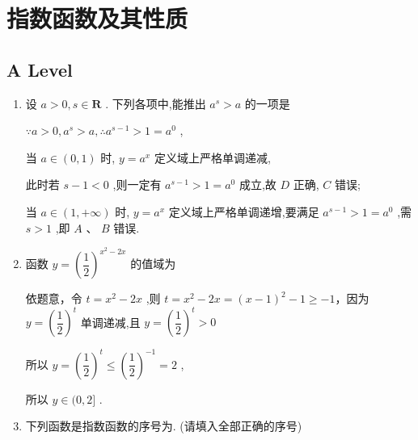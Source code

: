 \newpage
\quad
\newpage
\section*{指数函数及其性质}
\subsection*{A Level}
\begin{enumerate}
    \item 设 $a > 0,s \in  \mathbf{R}$ . 下列各项中,能推出 ${a}^{s} > a$ 的一项是
    \begin{jieda}
        $\because a > 0,{a}^{s} > a,\therefore {a}^{s - 1} > 1 = {a}^{0}$ ,
        
        当 $a \in  \left( {0,1}\right)$ 时, $y = {a}^{x}$ 定义域上严格单调递减,
        
        此时若 $s - 1 < 0$ ,则一定有 ${a}^{s - 1} > 1 = {a}^{0}$ 成立,故 ${D}$ 正确, ${C}$ 错误;
        
        当 $a \in  \left( {1, + \infty }\right)$ 时, $y = {a}^{x}$ 定义域上严格单调递增,要满足 ${a}^{s - 1} > 1 = {a}^{0}$ ,需 $s > 1$ ,即 ${A}\text{ 、 }{B}$ 错误.
    \end{jieda}
    \item  函数 $y = {\left( \dfrac{1}{2}\right) }^{{x}^{2} - {2x}}$ 的值域为
    \begin{jieda}
        依题意，令 $t = {x}^{2} - {2x}$ ,则 $t = {x}^{2} - {2x} = {\left( x - 1\right) }^{2} - 1 \geq   - 1$，因为 $y = {\left( \dfrac{1}{2}\right) }^{t}$ 单调递减,且 $y = {\left( \dfrac{1}{2}\right) }^{t} > 0$
        
        所以 $y = {\left( \dfrac{1}{2}\right) }^{t} \leq  {\left( \dfrac{1}{2}\right) }^{-1} = 2$ ,
        
        所以 $y \in  (0,2\rbrack$ .
    \end{jieda}
    \item 下列函数是指数函数的序号为. (请填入全部正确的序号)


\end{enumerate}
